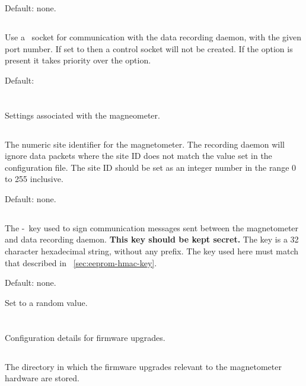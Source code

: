 Default: none.

\subsection{}
Use a \udp\ socket for communication with the data recording
daemon, with the given port number. If set to  then a
control socket will not be created. If the  option is
present it takes priority over the  option.

Default: 


\section{\code{[magnetometer]}}

Settings associated with the magneometer.

\subsection{}

The numeric site identifier for the magnetometer. The recording daemon
will ignore data packets where the site ID does not match the value
set in the configuration file. The site ID should be set as an integer
number in the range 0 to 255 inclusive.

Default: none.

\subsection{}
\label{sec:config-file-mag-key}
The \hmac-\mdfive\ key used to sign communication messages sent
between the magnetometer and data recording daemon. \textbf{This key
  should be kept secret.} The key is a 32 character hexadecimal
string, without any  prefix. The key used here must match
that described in \secname~\ref{sec:eeprom-hmac-key}.

Default: none.

Set to a random value.

\section{\code{[firmware]}}
Configuration details for firmware upgrades.

\subsection{}
The directory in which the firmware upgrades relevant to the
magnetometer hardware are stored. 

